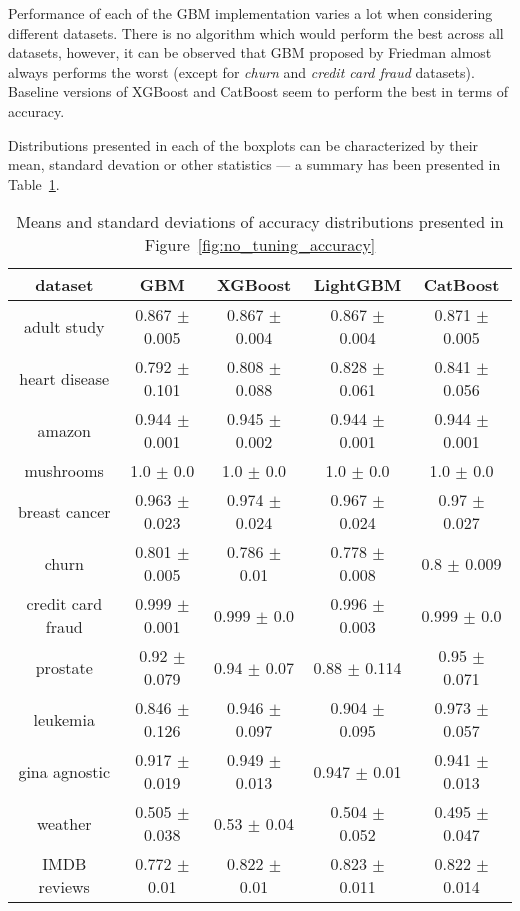 \documentclass[magisterska, english]{pwr_wmat_praca_dyplomowa}
\theoremstyle{plain}
\numberwithin{theorem}{chapter}
\theoremstyle{definition}
\numberwithin{theorem}{chapter}
\begin{document}
Performance of each of the GBM implementation varies a lot when considering different datasets. There is no algorithm which would perform the best across all datasets, however, it can be observed that GBM proposed by Friedman \cite{friedman_gbm} almost always performs the worst (except for \emph{churn} and \emph{credit card fraud} datasets). Baseline versions of XGBoost and CatBoost seem to perform the best in terms of accuracy. 

Distributions presented in each of the boxplots can be characterized by their mean, standard devation or other statistics --- a summary has been presented in Table~\ref{tab:no_tuning_accuracy}.

\begin{table}[h!]
\centering
\begin{tabular}{|c|c|c|c|c|}
\hline
\textbf{dataset}  & \textbf{GBM}  & \textbf{XGBoost}  & \textbf{LightGBM}  & \textbf{CatBoost} \\ \hline
adult study & \cellcolor{red}0.867 $\pm$ 0.005 & 0.867 $\pm$ 0.004 & 0.867 $\pm$ 0.004 & \cellcolor{green}0.871 $\pm$ 0.005\\ \hline
heart disease &\cellcolor{red} 0.792 $\pm$ 0.101 & 0.808 $\pm$ 0.088 & 0.828 $\pm$ 0.061 & \cellcolor{green}0.841 $\pm$ 0.056\\ \hline
amazon & \cellcolor{red}0.944 $\pm$ 0.001 & \cellcolor{green}0.945 $\pm$ 0.002 & \cellcolor{red}0.944 $\pm$ 0.001 & \cellcolor{red}0.944 $\pm$ 0.001\\ \hline
mushrooms & 1.0 $\pm$ 0.0 & 1.0 $\pm$ 0.0 & 1.0 $\pm$ 0.0 & 1.0 $\pm$ 0.0\\ \hline
breast cancer & \cellcolor{red}0.963 $\pm$ 0.023 & \cellcolor{green}0.974 $\pm$ 0.024 & 0.967 $\pm$ 0.024 & 0.97 $\pm$ 0.027\\ \hline
churn & \cellcolor{green}0.801 $\pm$ 0.005 & 0.786 $\pm$ 0.01 & \cellcolor{red}0.778 $\pm$ 0.008 & 0.8 $\pm$ 0.009\\ \hline
credit card fraud & 0.999 $\pm$ 0.001 & \cellcolor{green}0.999 $\pm$ 0.0 & \cellcolor{red}0.996 $\pm$ 0.003 & \cellcolor{green}0.999 $\pm$ 0.0\\ \hline
prostate & 0.92 $\pm$ 0.079 & 0.94 $\pm$ 0.07 & \cellcolor{red}0.88 $\pm$ 0.114 & \cellcolor{green}0.95 $\pm$ 0.071\\ \hline
leukemia & \cellcolor{red}0.846 $\pm$ 0.126 & 0.946 $\pm$ 0.097 & 0.904 $\pm$ 0.095 & \cellcolor{green}0.973 $\pm$ 0.057\\ \hline
gina agnostic & \cellcolor{red}0.917 $\pm$ 0.019 & \cellcolor{green}0.949 $\pm$ 0.013 & 0.947 $\pm$ 0.01 & 0.941 $\pm$ 0.013\\ \hline
weather & 0.505 $\pm$ 0.038 & \cellcolor{green}0.53 $\pm$ 0.04 & 0.504 $\pm$ 0.052 & \cellcolor{red}0.495 $\pm$ 0.047\\ \hline
IMDB reviews & \cellcolor{red}0.772 $\pm$ 0.01 & 0.822 $\pm$ 0.01 & \cellcolor{green}0.823 $\pm$ 0.011 & 0.822 $\pm$ 0.014\\ \hline
\end{tabular}
\caption{Means and standard deviations of accuracy distributions presented in Figure~\ref{fig:no_tuning_accuracy}}
\label{tab:no_tuning_accuracy}
\end{table}
\end{document}
